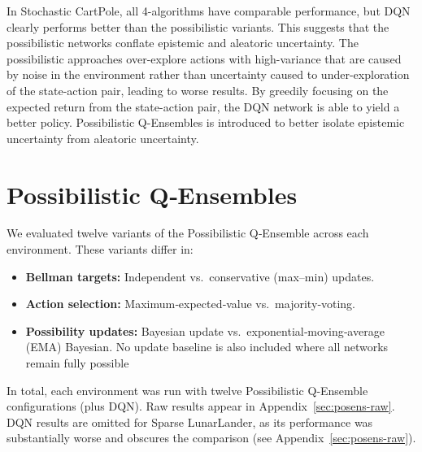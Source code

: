 \documentclass[11pt,a4paper]{report}
\begin{document}
In Stochastic CartPole, all 4-algorithms have comparable performance, but DQN clearly performs better than the possibilistic variants. This suggests that the possibilistic networks conflate epistemic and aleatoric uncertainty. The possibilistic approaches over-explore actions with high-variance that are caused by noise in the environment rather than uncertainty caused to under-exploration of the state-action pair, leading to worse results. By greedily focusing on the expected return from the state-action pair, the DQN network is able to yield a better policy. Possibilistic Q-Ensembles is introduced to better isolate epistemic uncertainty from aleatoric uncertainty. 

\section{Possibilistic Q‐Ensembles}


We evaluated twelve variants of the Possibilistic Q‐Ensemble across each environment. These variants differ in:

\begin{itemize}
  \item \textbf{Bellman targets:} Independent vs.\ conservative (max–min) updates.
  \item \textbf{Action selection:} Maximum‐expected‐value vs.\ majority‐voting.
  \item \textbf{Possibility updates:} Bayesian update vs.\ exponential‐moving‐average (EMA) Bayesian. No update baseline is also included where all networks remain fully possible
\end{itemize}

 In total, each environment was run with twelve Possibilistic Q‐Ensemble configurations (plus DQN).  Raw results appear in Appendix~\ref{sec:posens-raw}.  DQN results are omitted for Sparse LunarLander, as its performance was substantially worse and obscures the comparison (see Appendix~\ref{sec:posens-raw}).
\end{document}
